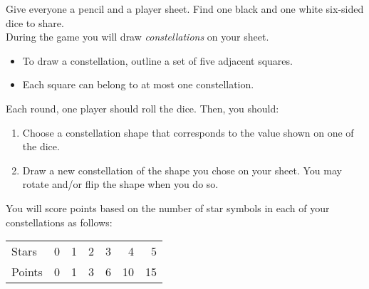\begin{minipage}{6cm}\raggedright

\setmainfont{Tex Gyre Schola}

Give everyone a pencil and a player sheet. Find one black and one white six-sided dice to share.\\[1.0ex]

During the game you will draw \emph{constellations} on your sheet.
\begin{itemize}[leftmargin=*]
\vspace{-0.7ex}
\item To draw a constellation, outline a set of five adjacent squares.
\vspace{-0.7ex}
\item Each square can belong to at most one constellation.%
\end{itemize}

\vspace{-0.7ex}

Each round, one player should roll the dice.  Then, you should:
\begin{enumerate}[leftmargin=*]
\vspace{-0.7ex}
\item Choose a constellation shape that corresponds to the value shown on one of the dice.%
\vspace{-0.7ex}
\item Draw a new constellation of the shape you chose on your sheet. You may rotate and/or flip the shape when you do so.%
\end{enumerate}



\vspace{-0.7ex}

You will score points based on the number of star symbols in each of your constellations as follows:
\begin{center}
{
\small
\begin{tabular}{lrrrrrr} \toprule
Stars & 0 & 1 & 2 & 3 & 4 & 5 \\
Points & 0 & 1 & 3 & 6 & 10 & 15 \\\bottomrule
\end{tabular}
}
\end{center}


\end{minipage}
